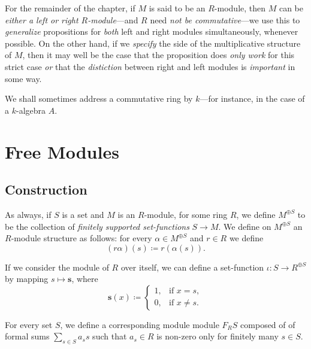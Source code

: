 \begin{remark}
    \label{rem:R-modules-convension}
    For the remainder of the chapter, if \(M\) is said to be an \(R\)-module, then
    \(M\) can be \emph{either a left or right \(R\)-module}---and \(R\) need
    \emph{not be commutative}---we use this to \emph{generalize} propositions for
    \emph{both} left and right modules simultaneously, whenever possible. On the
    other hand, if we \emph{specify} the side of the multiplicative structure of
    \(M\), then it may well be the case that the proposition does \emph{only work}
    for this strict case \emph{or} that the \emph{distiction} between right and left
    modules is \emph{important} in some way.
\end{remark}

\begin{remark}
    \label{rem:algebras-and-commutative-rings}
    We shall sometimes address a commutative ring by \(k\)---for instance, in the case
    of a \(k\)-algebra \(A\).
\end{remark}

\section{Free Modules}

\subsection{Construction}

As always, if \(S\) is a set and \(M\) is an \(R\)-module, for some ring \(R\),
we define \(M^{\oplus S}\) to be the collection of \emph{finitely supported
    set-functions} \(S \to M\). We define on \(M^{\oplus S}\) an \(R\)-module
structure as follows: for every \(\alpha \in M^{\oplus S}\) and \(r \in R\) we
define
\[
    (r \alpha)(s) \coloneq r (\alpha(s)).
\]

If we consider the module of \(R\) over itself, we can define a set-function
\(\iota: S \to R^{\oplus S}\) by mapping \(s \mapsto \mathbf{s}\), where
\[
    \mathbf{s}(x) \coloneq
    \begin{cases}
        1, & \text{if } x = s,    \\
        0, & \text{if } x \neq s.
    \end{cases}
\]

For every set \(S\), we define a corresponding module module \(F_R S\) composed
of of formal sums \(\sum_{s \in S} a_s s\) such that \(a_s \in R\) is non-zero
only for finitely many \(s \in S\).


